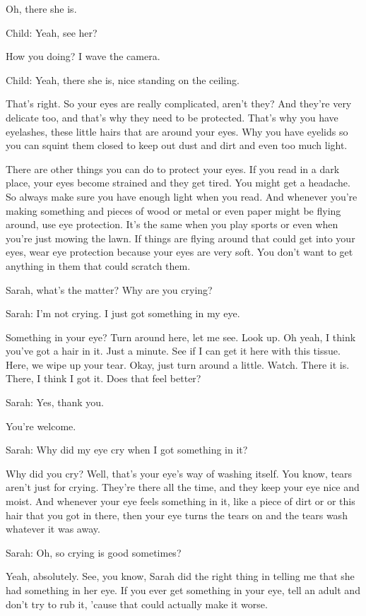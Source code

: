 Oh, there she is.

Child: Yeah, see her?

How you doing? I wave the camera.

Child: Yeah, there she is, nice standing on the ceiling.

That's right. So your eyes are really complicated, aren't they? And they're very delicate too, and that's why they need to be protected. That's why you have eyelashes, these little hairs that are around your eyes. Why you have eyelids so you can squint them closed to keep out dust and dirt and even too much light.

There are other things you can do to protect your eyes. If you read in a dark place, your eyes become strained and they get tired. You might get a headache. So always make sure you have enough light when you read. And whenever you're making something and pieces of wood or metal or even paper might be flying around, use eye protection. It's the same when you play sports or even when you're just mowing the lawn. If things are flying around that could get into your eyes, wear eye protection because your eyes are very soft. You don't want to get anything in them that could scratch them.

Sarah, what's the matter? Why are you crying?

Sarah: I'm not crying. I just got something in my eye.

Something in your eye? Turn around here, let me see. Look up. Oh yeah, I think you've got a hair in it. Just a minute. See if I can get it here with this tissue. Here, we wipe up your tear. Okay, just turn around a little. Watch. There it is. There, I think I got it. Does that feel better?

Sarah: Yes, thank you.

You're welcome.

Sarah: Why did my eye cry when I got something in it?

Why did you cry? Well, that's your eye's way of washing itself. You know, tears aren't just for crying. They're there all the time, and they keep your eye nice and moist. And whenever your eye feels something in it, like a piece of dirt or or this hair that you got in there, then your eye turns the tears on and the tears wash whatever it was away.

Sarah: Oh, so crying is good sometimes?

Yeah, absolutely. See, you know, Sarah did the right thing in telling me that she had something in her eye. If you ever get something in your eye, tell an adult and don't try to rub it, 'cause that could actually make it worse.

